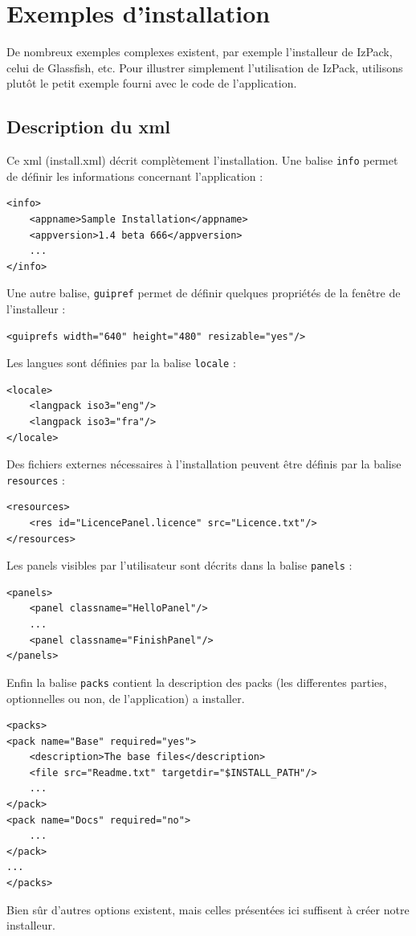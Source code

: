 \section{Exemples d'installation}
De nombreux exemples complexes existent, par exemple l'installeur de IzPack, celui de Glassfish, etc. Pour illustrer simplement l'utilisation de IzPack, utilisons plutôt le petit exemple fourni avec le code de l'application.

\subsection{Description du xml}


Ce xml (install.xml) décrit complètement l'installation.
Une balise \verb|info| permet de définir les informations concernant l'application : 
\begin{lstlisting}
<info>
	<appname>Sample Installation</appname>
	<appversion>1.4 beta 666</appversion>
	...
</info>
\end{lstlisting}
Une autre balise, \verb|guipref| permet de définir quelques propriétés de la fenêtre de l'installeur :
\begin{lstlisting}
<guiprefs width="640" height="480" resizable="yes"/>
\end{lstlisting}
Les langues sont définies par la balise \verb|locale| :
\begin{lstlisting}
<locale>
	<langpack iso3="eng"/>
	<langpack iso3="fra"/>
</locale>
\end{lstlisting}
Des fichiers externes nécessaires à l'installation peuvent être définis par la balise \verb|resources| :

\begin{lstlisting}
<resources>
	<res id="LicencePanel.licence" src="Licence.txt"/>
</resources>
\end{lstlisting}
Les panels visibles par l'utilisateur sont décrits dans la balise \verb|panels| :
\begin{lstlisting}
<panels>
	<panel classname="HelloPanel"/>
	...
	<panel classname="FinishPanel"/>
</panels>
\end{lstlisting}
Enfin la balise \verb|packs| contient la description des packs (les differentes parties, optionnelles ou non, de l'application) a installer.
\begin{lstlisting}
<packs>
<pack name="Base" required="yes">
	<description>The base files</description>
	<file src="Readme.txt" targetdir="$INSTALL_PATH"/>
	...
</pack>
<pack name="Docs" required="no">
	...
</pack>
...
</packs>
\end{lstlisting}
Bien sûr d'autres options existent, mais celles présentées ici suffisent à créer notre installeur.
